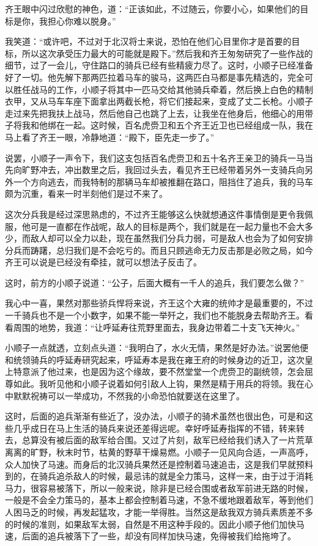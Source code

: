 齐王眼中闪过欣慰的神色，道：“正该如此，不过随云，你要小心，如果他们的目标是你，我担心你难以脱身。”

我笑道：“或许吧，不过对于北汉将士来说，恐怕在他们心目里你才是首要的目标，所以这次承受压力最大的可能就是殿下。”然后我和齐王匆匆研究了一些作战的细节，过了一会儿，守住路口的骑兵已经有些精疲力尽了。这时，小顺子已经准备好了一切。他先解下那两匹拉着马车的骏马，这两匹白马都是事先精选的，完全可以胜任战马的工作，小顺子将其中一匹马交给其他骑兵牵着，然后换上白色的精制衣甲，又从马车车座下面拿出两截长枪，将它们接起来，变成了丈二长枪。小顺子走过来先把我扶上战马，然后他自己也跳了上去，让我坐在他身后，他细心的用带子将我和他绑在一起。这时候，百名虎赍卫和五个齐王近卫也已经组成一队，我在马上看了齐王一眼，冷静地道：“殿下，臣先走一步了。”

说罢，小顺子一声令下，我们这支包括百名虎赍卫和五十名齐王亲卫的骑兵一马当先向旷野冲去，冲出数里之后，我回过头去，看见齐王已经带着另外一支骑兵向另外一个方向逃去，而我特制的那辆马车却被推翻在路口，阻挡住了追兵，我的马车颇为沉重，看来一时半刻他们是过不来了。

这次分兵我是经过深思熟虑的，不过齐王能够这么快就想通这件事情倒是更令我佩服，他可是一直都在作战呢，敌人的目标是两个，我们就是在一起力量也不会大多少，而敌人却可以全力以赴，现在虽然我们分兵力弱，可是敌人也会为了如何安排分兵而踌躇，总归我们是不会吃亏的。而且只顾逃命无力反击那是必败之局，如今齐王可以说是已经没有牵挂，就可以想法子反击了。

这时，前方的小顺子说道：“公子，后面大概有一千人的追兵，我们要怎么做？”

我心中一喜，果然对那些骄兵悍将来说，齐王这个大雍的统帅才是最重要的，不过一千骑兵也不是一个小数字，如果不能一举歼之，我们也不能脱身去帮助齐王。看看周围的地势，我道：“让呼延寿往荒野里面去，我身边带着二十支飞天神火。”

小顺子一点就透，立刻点头道：“我明白了，水火无情，果然是好办法。”说罢他便和统领骑兵的呼延寿研究起来，呼延寿本是我在雍王府的时候身边的近卫，这次皇上特意派了他过来，也是因为这个缘故，要不然堂堂一个虎赍卫的副统领，怎会屈尊如此。我听见他和小顺子说着如何引敌人上钩，果然是精于用兵的将领。我在心中默默祝祷可以一举成功，不然我的小命恐怕就要送在这里了。

这时，后面的追兵渐渐有些近了，没办法，小顺子的骑术虽然也很出色，可是和这些几乎成日在马上生活的骑兵来说还差得远呢。幸好呼延寿指挥的不错，转来转去，总算没有被后面的敌军给合围。又过了片刻，敌军已经给我们诱入了一片荒草离离的旷野，秋末时节，枯黄的野草干燥易燃。小顺子一见风向合适，一声高呼，众人加快了马速。而身后的北汉骑兵果然还是控制着马速追击，这是我们早就预料到的，在骑兵追杀敌人的时候，最忌讳的就是全力策马，这样一来，由于过于消耗马力，很容易被落下，所以一般来说，除非是已经合围或者敌军前进无路的时候，一般是不会全力策马的，基本上都会控制着马速，不急不缓地跟着敌军，等到他们人困马乏的时候，再发起猛攻，才能一举得胜。当然这是敌我双方骑兵素质差不多的时候的准则，如果敌军太弱，自然是不用这种手段的。因此小顺子他们加快马速，后面的追兵被落下了一些，却没有同样加快马速，免得被我们给拖垮了。

